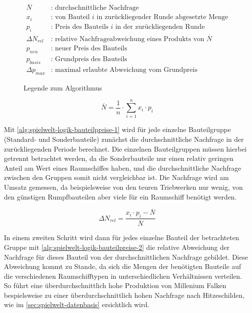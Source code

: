 \newcommand{\pd}{\Delta{}p_{max}}
\begin{figure}[ht]
\begin{align}
\overline{N} &\text{: durchschnittliche Nachfrage}\nonumber \\
x_i &\text{: von Bauteil $i$ in zurückliegender Runde abgesetzte Menge}\nonumber \\
p_i &\text{: Preis des Bauteils $i$ in der zurückliegenden Runde}\nonumber \\
\Delta{}N_{rel} &\text{: relative Nachfrageabweichung eines Produkts von $\overline{N}$}\nonumber \\
p_{neu} &\text{: neuer Preis des Bauteils}\nonumber \\
p_{basis} &\text{: Grundpreis des Bauteils}\nonumber \\
\Delta{}p_{max} &\text{: maximal erlaubte Abweichung vom Grundpreis}\nonumber
\end{align}
\caption{Legende zum Algorithmus}
\label{alg:spielwelt-logik-bauteilpreise-legende}
\end{figure}

\begin{equation}
\overline{N} = \frac{1}{n} \cdot \sum\limits_{i=1}^n {x_i \cdot p_i}
\label{alg:spielwelt-logik-bauteilpreise-1}
\end{equation}

Mit \ref{alg:spielwelt-logik-bauteilpreise-1} wird für jede einzelne Bauteilgruppe (Standard- und Sonderbauteile) zunächst die durchschnittliche Nachfrage in der zurückliegenden Periode berechnet. Die einzelnen Bauteilgruppen müssen hierbei getrennt betrachtet werden, da die Sonderbauteile nur einen relativ geringen Anteil am Wert eines Raumschiffes haben, und die durchschnittliche Nachfrage zwischen den Gruppen somit nicht vergleichbar ist. Die Nachfrage wird am Umsatz gemessen, da beispielsweise von den teuren Triebwerken nur wenig, von den günstigen Rumpfbauteilen aber viele für ein Raumschiff benötigt werden.

\begin{equation}
\Delta{}N_{rel} = \frac{x_i \cdot p_i - \overline{N}}{\overline{N}}
\label{alg:spielwelt-logik-bauteilpreise-2}
\end{equation}

In einem zweiten Schritt wird dann für jedes einzelne Bauteil der betrachteten Gruppe mit \ref{alg:spielwelt-logik-bauteilpreise-2} die relative Abweichung der Nachfrage für dieses Bauteil von der durchschnittlichen Nachfrage gebildet. Diese Abweichung kommt zu Stande, da sich die Mengen der benötigten Bauteile auf die verschiedenen Raumschifftypen in unterschiedlichen Verhältnissen verteilen. So führt eine überdurchschnittlich hohe Produktion von Millenium Falken bespielsweise zu einer überdurchschnittlich hohen Nachfrage nach Hitzeschilden, wie im \ref{sec:spielwelt-datenbasis} ersichtlich wird.

